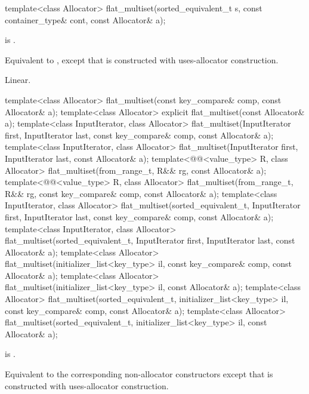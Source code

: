 %
\begin{itemdecl}
template<class Allocator>
  flat_multiset(sorted_equivalent_t s, const container_type& cont, const Allocator& a);
\end{itemdecl}

\begin{itemdescr}
\pnum
\constraints
{} is .

\pnum
\effects
Equivalent to ,
except that  is constructed with
uses-allocator construction.

\pnum
\complexity
Linear.
\end{itemdescr}

%
\begin{itemdecl}
template<class Allocator>
  flat_multiset(const key_compare& comp, const Allocator& a);
template<class Allocator>
  explicit flat_multiset(const Allocator& a);
template<class InputIterator, class Allocator>
  flat_multiset(InputIterator first, InputIterator last,
                const key_compare& comp, const Allocator& a);
template<class InputIterator, class Allocator>
  flat_multiset(InputIterator first, InputIterator last, const Allocator& a);
template<@@<value_type> R, class Allocator>
  flat_multiset(from_range_t, R&& rg, const Allocator& a);
template<@@<value_type> R, class Allocator>
  flat_multiset(from_range_t, R&& rg, const key_compare& comp, const Allocator& a);
template<class InputIterator, class Allocator>
  flat_multiset(sorted_equivalent_t, InputIterator first, InputIterator last,
                const key_compare& comp, const Allocator& a);
template<class InputIterator, class Allocator>
  flat_multiset(sorted_equivalent_t, InputIterator first, InputIterator last, const Allocator& a);
template<class Allocator>
  flat_multiset(initializer_list<key_type> il, const key_compare& comp, const Allocator& a);
template<class Allocator>
  flat_multiset(initializer_list<key_type> il, const Allocator& a);
template<class Allocator>
  flat_multiset(sorted_equivalent_t, initializer_list<key_type> il,
                const key_compare& comp, const Allocator& a);
template<class Allocator>
  flat_multiset(sorted_equivalent_t, initializer_list<key_type> il, const Allocator& a);
\end{itemdecl}

\begin{itemdescr}
\pnum
\constraints
{} is .

\pnum
\effects
Equivalent to the corresponding non-allocator constructors
except that  is constructed with
uses-allocator construction.
\end{itemdescr}

